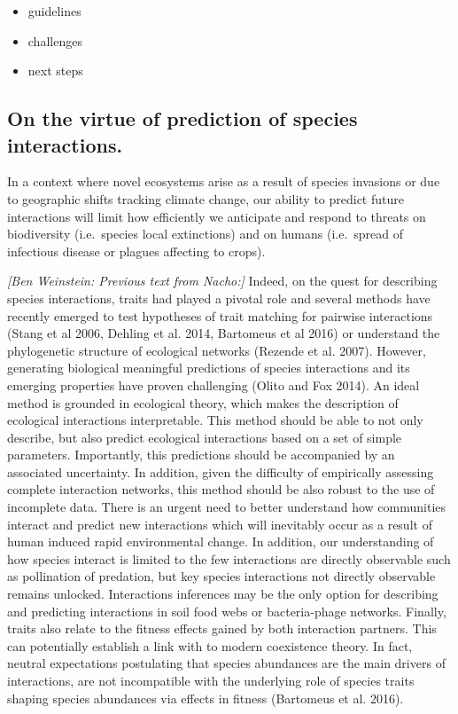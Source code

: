 \begin{itemize} \item guidelines \item challenges \item next steps \end{itemize}

\subsection*{On the virtue of prediction of species
interactions.}\label{on-the-virtue-of-prediction-of-species-interactions.}

In a context where novel ecosystems arise as a result of species invasions or
due to geographic shifts tracking climate change, our ability to predict future
interactions will limit how efficiently we anticipate and respond to threats on
biodiversity (i.e.~species local extinctions) and on humans (i.e.~spread of
infectious disease or plagues affecting to crops).

\emph{{[}Ben Weinstein: Previous text from Nacho:{]}} Indeed, on the quest for
describing species interactions, traits had played a pivotal role and several
methods have recently emerged to test hypotheses of trait matching for pairwise
interactions (Stang et al 2006, Dehling et al. 2014, Bartomeus et al 2016) or
understand the phylogenetic structure of ecological networks (Rezende et al.
2007). However, generating biological meaningful predictions of species
interactions and its emerging properties have proven challenging (Olito and Fox
2014). An ideal method is grounded in ecological theory, which makes the
description of ecological interactions interpretable. This method should be able
to not only describe, but also predict ecological interactions based on a set of
simple parameters. Importantly, this predictions should be accompanied by an
associated uncertainty. In addition, given the difficulty of empirically
assessing complete interaction networks, this method should be also robust to
the use of incomplete data. There is an urgent need to better understand how
communities interact and predict new interactions which will inevitably occur as
a result of human induced rapid environmental change. In addition, our
understanding of how species interact is limited to the few interactions are
directly observable such as pollination of predation, but key species
interactions not directly observable remains unlocked. Interactions inferences
may be the only option for describing and predicting interactions in soil food
webs or bacteria-phage networks. Finally, traits also relate to the fitness
effects gained by both interaction partners. This can potentially establish a
link with to modern coexistence theory. In fact, neutral expectations
postulating that species abundances are the main drivers of interactions, are
not incompatible with the underlying role of species traits shaping species
abundances via effects in fitness (Bartomeus et al. 2016).

